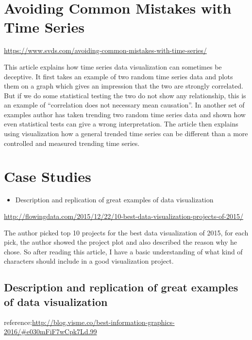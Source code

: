 \documentclass[]{book}
\providecommand{\tightlist}{%
  \setlength{\itemsep}{0pt}\setlength{\parskip}{0pt}}
\theoremstyle{definition}
\theoremstyle{definition}
\theoremstyle{definition}
\theoremstyle{remark}
\begin{document}
\chapter{Avoiding Common Mistakes with Time
Series}\label{avoiding-common-mistakes-with-time-series}

\url{https://www.svds.com/avoiding-common-mistakes-with-time-series/}

This article explains how time series data visualization can sometimes
be deceptive. It first takes an example of two random time series data
and plots them on a graph which gives an impression that the two are
strongly correlated. But if we do some statistical testing the two do
not show any relationship, this is an example of ``correlation does not
necessary mean causation''. In another set of examples author has taken
trending two random time series data and shown how even statistical
tests can give a wrong interpretation. The article then explains using
visualization how a general trended time series can be different than a
more controlled and measured trending time series.

\chapter{Case Studies}\label{case-studies}

\begin{itemize}
\tightlist
\item
  Description and replication of great examples of data visualization
\end{itemize}

\url{http://flowingdata.com/2015/12/22/10-best-data-visualization-projects-of-2015/}

The author picked top 10 projects for the best data visualization of
2015, for each pick, the author showed the project plot and also
described the reason why he chose. So after reading this article, I have
a basic understanding of what kind of characters should include in a
good visualization project.

\section{Description and replication of great examples of data
visualization}\label{description-and-replication-of-great-examples-of-data-visualization}

reference:\url{http://blog.visme.co/best-information-graphics-2016/\#e030mFiF7wCpk7Ld.99}
\end{document}
